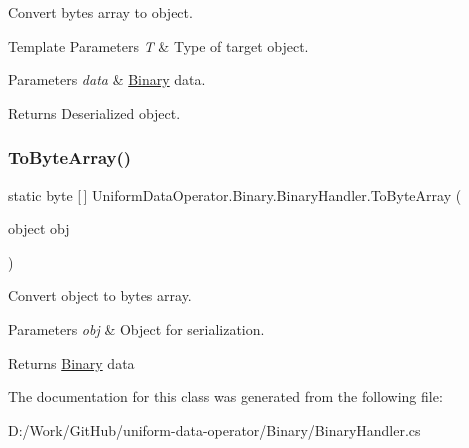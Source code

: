 Convert bytes array to object. 


\begin{DoxyTemplParams}{Template Parameters}
{\em T} & Type of target object.\\
\hline
\end{DoxyTemplParams}

\begin{DoxyParams}{Parameters}
{\em data} & \mbox{\hyperlink{namespace_uniform_data_operator_1_1_binary}{Binary}} data.\\
\hline
\end{DoxyParams}
\begin{DoxyReturn}{Returns}
Deserialized object.
\end{DoxyReturn}
\mbox{\label{class_uniform_data_operator_1_1_binary_1_1_binary_handler_abe3a726c904b29b5817e0ad39a4e1463}} 
\subsubsection{\texorpdfstring{To\+Byte\+Array()}{ToByteArray()}}
{\footnotesize\ttfamily static byte \mbox{[}$\,$\mbox{]} Uniform\+Data\+Operator.\+Binary.\+Binary\+Handler.\+To\+Byte\+Array (\begin{DoxyParamCaption}\item[{object}]{obj }\end{DoxyParamCaption})\hspace{0.3cm}{\ttfamily [static]}}



Convert object to bytes array. 


\begin{DoxyParams}{Parameters}
{\em obj} & Object for serialization.\\
\hline
\end{DoxyParams}
\begin{DoxyReturn}{Returns}
\mbox{\hyperlink{namespace_uniform_data_operator_1_1_binary}{Binary}} data
\end{DoxyReturn}


The documentation for this class was generated from the following file\+:\begin{DoxyCompactItemize}
\item 
D\+:/\+Work/\+Git\+Hub/uniform-\/data-\/operator/\+Binary/Binary\+Handler.\+cs\end{DoxyCompactItemize}
